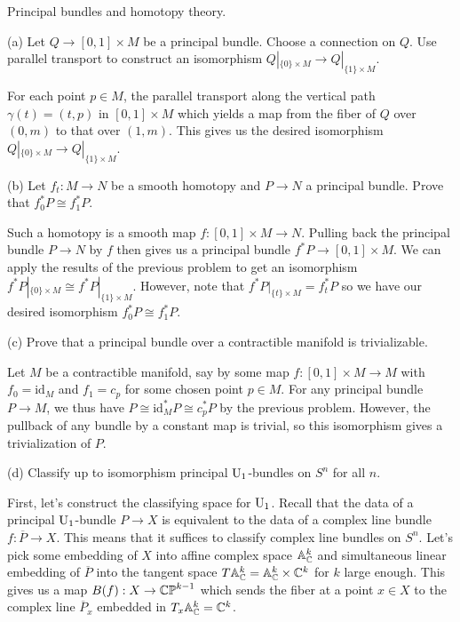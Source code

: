 \documentclass{../../templates/lkx_pset}
\begin{document}
\begin{problem}{4}
Principal bundles and homotopy theory.
\end{problem}
\begin{parts}
	\begin{part}{(a)}
		Let $Q \to [0,1]\times M$ be a principal bundle. Choose a connection on $Q$. Use parallel transport to construct an isomorphism $Q|_{\{0\}\times M} \to Q|_{\{1\}\times M}$.
	\end{part}

	For each point $p\in M$, the parallel transport along the vertical path $\gamma(t) = (t,p)$ in $[0,1]\times M$ which yields a map from the fiber of $Q$ over $(0,m)$ to that over $(1,m)$. This gives us the desired isomorphism $Q|_{\{0\}\times M} \to Q|_{\{1\}\times M}$.

	\begin{part}{(b)}
		Let $f_t : M \to N$ be a smooth homotopy and $P\to N$ a principal bundle. Prove that $f_0^*P\cong f_1^*P$.
	\end{part}

	Such a homotopy is a smooth map $f : [0,1]\times M \to N$. Pulling back the principal bundle $P \to N$ by $f$ then gives us a principal bundle $f^*P \to [0,1]\times M$. We can apply the results of the previous problem to get an isomorphism
	$f^*P|_{\{0\}\times M}\cong f^*P|_{\{1\}\times M}$. However, note that $f^* P|_{\{t\}\times M}  =f_t^*P$ so we have our desired isomorphism $f_0^*P\cong f_1^*P$.

	\begin{part}{(c)}
		Prove that a principal bundle over a contractible manifold is trivializable.
	\end{part}

	Let $M$ be a contractible manifold, say by some map $f : [0,1]\times M \to M$ with $f_0 = \textrm{id}_M$ and $f_1 = c_p$ for some chosen point $p\in M$. For any principal bundle $P \to M$, we thus have $P\cong \textrm{id}_M^* P \cong c_p^* P$ by the previous problem. However, the pullback of any bundle by a constant map is trivial, so this isomorphism gives a trivialization of $P$.

	\begin{part}{(d)}
		Classify up to isomorphism principal $\operatorname{U}_1$-bundles on $S^n$ for all $n$.
	\end{part}

	First, let's construct the classifying space for $\operatorname{U}_1$. Recall that the data of a principal $\operatorname{U}_1$-bundle $P\to X$ is equivalent to the data of a complex line bundle $f : \overline{P} \to X$. This means that it suffices to classify complex line bundles on $S^n$. Let's pick some embedding of $X$ into affine complex space $\mathbb{A}_{\mathbb{C}}^k$ and simultaneous linear embedding of $\overline{P}$ into the tangent space $T\mathbb{A}_{\mathbb{C}}^k=\mathbb{A}_{\mathbb{C}}^k\times \mathbb{C}^k$ for $k$ large enough. This gives us a map $B(f) : X \to \mathbb{CP}^{k-1}$ which sends the fiber at a point $x\in X$ to the complex line $\overline{P}_x$ embedded in $T_x\mathbb{A}_{\mathbb{C}}^k = \mathbb{C}^k$.


\end{parts}
\end{document}
